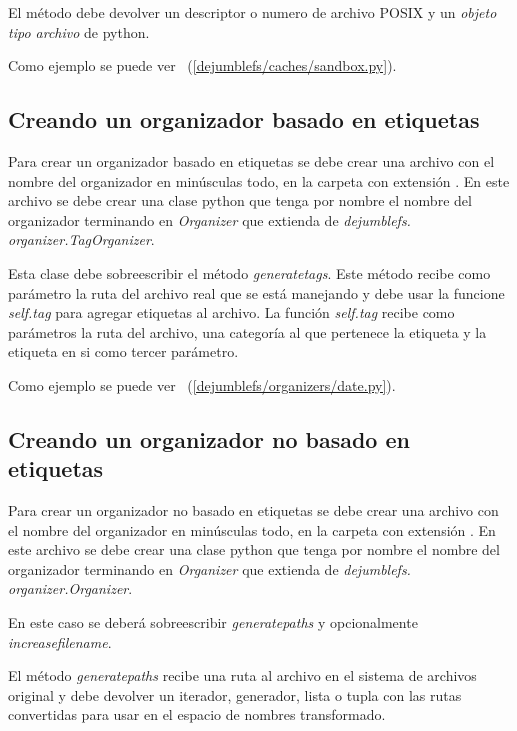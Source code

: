 El método debe devolver un descriptor o numero de archivo POSIX y un \textit{objeto tipo archivo} de python.

Como ejemplo se puede ver ~(\ref{dejumblefs/caches/sandbox.py}).

\subsection{Creando un organizador basado en etiquetas}

Para crear un organizador basado en etiquetas se debe crear una archivo con el nombre del organizador en minúsculas todo, en la carpeta  con extensión . En este archivo se debe crear una clase python que tenga por nombre el nombre del organizador terminando en \textit{Organizer} que extienda de \textit{dejumblefs. organizer.TagOrganizer}.

Esta clase debe sobreescribir el método \textit{generatetags}. Este método recibe como parámetro la ruta del archivo real que se está manejando y debe usar la funcione \textit{self.tag} para agregar etiquetas al archivo. La función \textit{self.tag} recibe como parámetros la ruta del archivo, una categoría al que pertenece la etiqueta y la etiqueta en si como tercer parámetro.

Como ejemplo se puede ver ~(\ref{dejumblefs/organizers/date.py}).

\subsection{Creando un organizador no basado en etiquetas}

Para crear un organizador no basado en etiquetas se debe crear una archivo con el nombre del organizador en minúsculas todo, en la carpeta  con extensión . En este archivo se debe crear una clase python que tenga por nombre el nombre del organizador terminando en \textit{Organizer} que extienda de \textit{dejumblefs. organizer.Organizer}.

En este caso se deberá sobreescribir \textit{generatepaths} y opcionalmente \textit{increasefilename}.

El método \textit{generatepaths} recibe una ruta al archivo en el sistema de archivos original y debe devolver un iterador, generador, lista o tupla con las rutas convertidas para usar en el espacio de nombres transformado.

